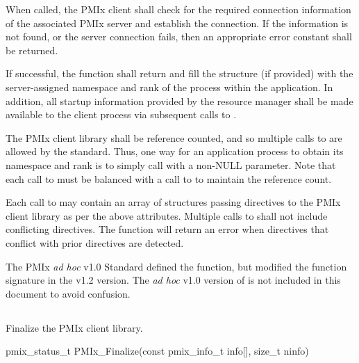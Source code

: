 When called, the \ac{PMIx} client shall check for the required connection information of the associated \ac{PMIx} server and establish the connection.
If the information is not found, or the server connection fails, then an appropriate error constant shall be returned.

If successful, the function shall return  and fill the  structure (if provided) with the server-assigned namespace and rank of the process within the application.
In addition, all startup information provided by the resource manager shall be made available to the client process via subsequent calls to .

The \ac{PMIx} client library shall be reference counted, and so multiple calls to  are allowed by the standard.
Thus, one way for an application process to obtain its namespace and rank is to simply call  with a non-NULL  parameter.
Note that each call to  must be balanced with a call to  to maintain the reference count.

Each call to  may contain an array of  structures passing directives to the \ac{PMIx} client library as per the above attributes.
Multiple calls to  shall not include conflicting directives.
The  function will return an error when directives that conflict with prior directives are detected.

\adviceuserstart
The \ac{PMIx} \textit{ad hoc} v1.0 Standard defined the  function, but modified the function signature in the v1.2 version. The \textit{ad hoc} v1.0 version of  is not included in this document to avoid confusion.
\adviceuserend


\subsection{}

\summary

Finalize the \ac{PMIx} client library.

\format

\cspecificstart
\begin{codepar}
pmix_status_t
PMIx_Finalize(const pmix_info_t info[], size_t ninfo)
\end{codepar}
\cspecificend

